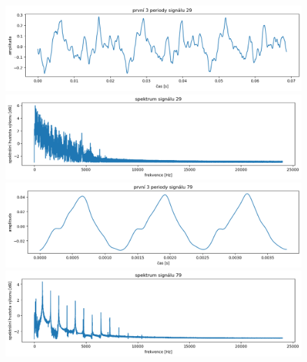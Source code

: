 \documentclass[a4paper, 12pt]{article}
\begin{document}
	\begin{figure}[H]
		\begin{minipage}{.5\textwidth}
			\includegraphics[width=\textwidth]{src/sign_a.png}
		\end{minipage}
		\begin{minipage}{.5\textwidth}
			\includegraphics[width=\textwidth]{src/spectr_a.png}
		\end{minipage}
		
		\begin{minipage}{.5\textwidth}
			\includegraphics[width=\textwidth]{src/sign_b.png}
		\end{minipage}
		\begin{minipage}{.5\textwidth}
			\includegraphics[width=\textwidth]{src/spectr_b.png}
		\end{minipage}
		

\end{figure}
\end{document}

